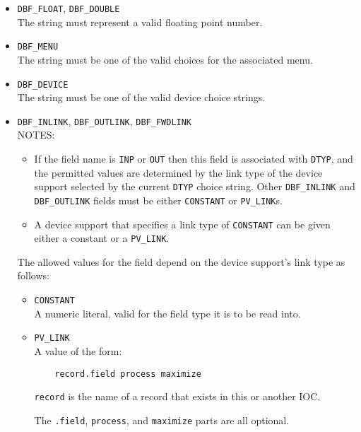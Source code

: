 \begin{description}
\begin{itemize}
\item \verb|DBF_FLOAT|, \verb|DBF_DOUBLE| \\
The string must represent a valid floating point number.

\item \verb|DBF_MENU| \\
The string must be one of the valid choices for the associated menu.

\item \verb|DBF_DEVICE| \\
The string must be one of the valid device choice strings.

\item \verb|DBF_INLINK|, \verb|DBF_OUTLINK|, \verb|DBF_FWDLINK| \\
NOTES:

\begin{itemize}
\item If the field name is \verb|INP| or \verb|OUT| then this field is associated with \verb|DTYP|, and the permitted values
are determined by the link type of the device support selected by the current \verb|DTYP| choice string.
Other \verb|DBF_INLINK| and \verb|DBF_OUTLINK| fields must be either \verb|CONSTANT| or \verb|PV_LINK|s.

\item A device support that specifies a link type of \verb|CONSTANT| can be given either a constant or a \verb|PV_LINK|.
\end{itemize}

The allowed values for the field depend on the device support's link type as follows:

\begin{itemize}
\item \verb|CONSTANT| \\
A numeric literal, valid for the field type it is to be read into.

\item \verb|PV_LINK| \\
A value of the form:

\begin{verbatim}
    record.field process maximize
\end{verbatim}

\verb|record| is the name of a record that exists in this or another IOC.

The \verb|.field|, \verb|process|, and \verb|maximize| parts are all optional.


\end{itemize}
\end{itemize}
\end{description}
